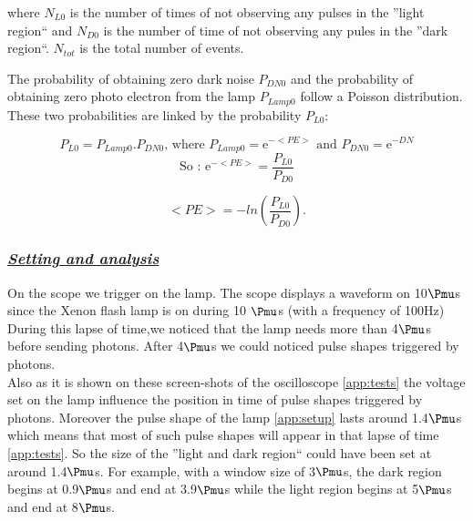 \documentclass[a4paper, 11pt]{report}%
\newcommand{\xfl}{Xenon flash lamp }
\begin{document}
  where \(N_{L0}\) is the number of times of not observing any pulses in the ''light region`` and \(N_{D0}\) is the number of time of not observing 
  any pules in the ''dark region``. 
  \(N_{tot}\) is the total number of events. 
  
  The probability of obtaining zero dark noise \(P_{DN0}\) and the probability of obtaining zero photo electron from the lamp \(P_{Lamp0}\)
  follow a Poisson distribution. These two probabilities are linked by the probability \(P_{L0}\): 
  
  \begin{equation}\label{eq:Poisson_law}
    P_{L0} = P_{Lamp0}.P_{DN0} \textrm{, where } P_{Lamp0} = \mathrm{e}^{-<PE>} \textrm{ and } P_{DN0} = \mathrm{e}^{-DN}
  \end{equation}
  \begin{equation}
    \textrm{So : } \mathrm{e}^{-<PE>} =\frac{P_{L0}}{P_{D0}}
  \end{equation}
  
  \begin{equation}
    <PE> =  -ln(\frac{P_{L0}}{P_{D0}}).
  \end{equation}
  
  \subsubsection{\textit{\underline{Setting and analysis}}}
  
  On the scope we trigger on the lamp. The scope displays a waveform on 10$\Pmu$s since the \xfl is on during 10 $\Pmu$s (with a frequency of 100Hz)\\
  During this lapse of time,we noticed that the lamp needs more than 4$\Pmu$s before sending photons. After 4$\Pmu$s we could noticed 
  pulse shapes triggered by photons.\\
  Also as it is shown on these screen-shots of the oscilloscope \ref{app:tests} the voltage set on the lamp influence the position 
  in time of pulse shapes triggered by photons. Moreover the pulse shape of the lamp \ref{app:setup} lasts around 1.4$\Pmu$s which means that 
  most of such pulse shapes will appear in that lapse of time \ref{app:tests}. So the size of the ''light and dark region`` could have
  been set at around 1.4$\Pmu$s. 
  For example, with a window size of 3$\Pmu$s, the dark region begins at 0.9$\Pmu$s and end at 3.9$\Pmu$s while the light region 
  begins at 5$\Pmu$s and end at 8$\Pmu$s.
  \\
  
\end{document}

